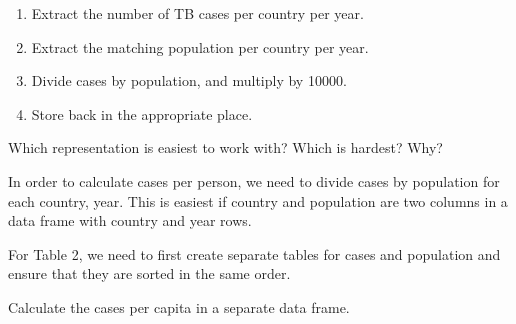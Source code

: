 \documentclass[]{book}
\newenvironment{Shaded}{\begin{snugshade}}{\end{snugshade}}
\newcommand{\DataTypeTok}[1]{\textcolor[rgb]{0.13,0.29,0.53}{#1}}
\newcommand{\DecValTok}[1]{\textcolor[rgb]{0.00,0.00,0.81}{#1}}
\newcommand{\KeywordTok}[1]{\textcolor[rgb]{0.13,0.29,0.53}{\textbf{#1}}}
\newcommand{\NormalTok}[1]{#1}
\newcommand{\OperatorTok}[1]{\textcolor[rgb]{0.81,0.36,0.00}{\textbf{#1}}}
\newcommand{\StringTok}[1]{\textcolor[rgb]{0.31,0.60,0.02}{#1}}
\providecommand{\tightlist}{%
  \setlength{\itemsep}{0pt}\setlength{\parskip}{0pt}}
\theoremstyle{plain}
\theoremstyle{remark}
\begin{document}
\begin{enumerate}
\def\labelenumi{\arabic{enumi}.}
\tightlist
\item
  Extract the number of TB cases per country per year.
\item
  Extract the matching population per country per year.
\item
  Divide cases by population, and multiply by 10000.
\item
  Store back in the appropriate place.
\end{enumerate}

Which representation is easiest to work with? Which is hardest? Why?

In order to calculate cases per person, we need to divide cases by population for each country, year.
This is easiest if country and population are two columns in a data frame with country and year rows.

For Table 2, we need to first create separate tables
for cases and population and ensure that they are sorted in the same order.

\begin{Shaded}
\end{Shaded}

Calculate the cases per capita in a separate data frame.

\begin{Shaded}
\end{Shaded}
\end{document}

